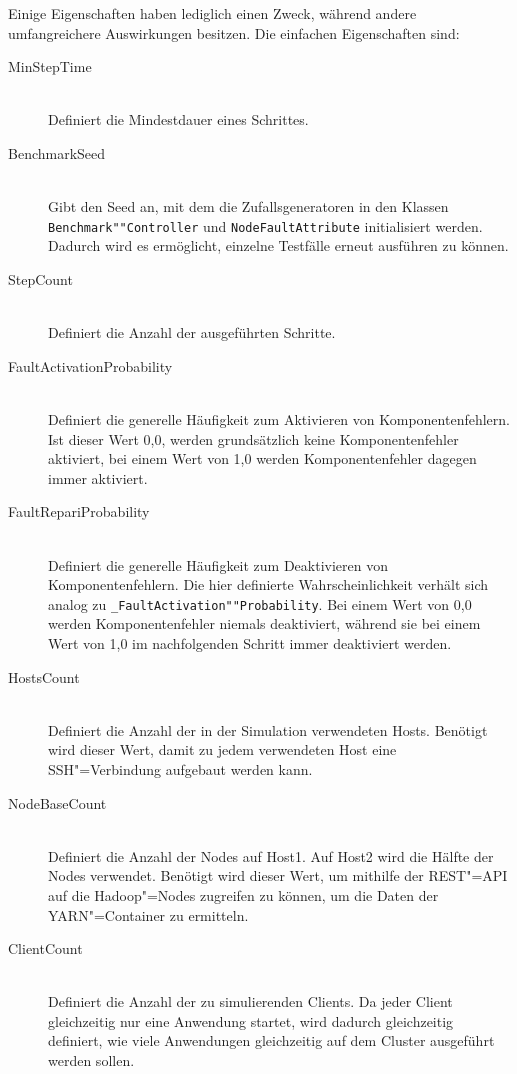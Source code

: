 Einige Eigenschaften haben lediglich einen Zweck, während andere umfangreichere Auswirkungen besitzen.
Die einfachen Eigenschaften sind:

\begin{description}
    \item [MinStepTime] \hfill \\
        Definiert die Mindestdauer eines Schrittes.
        
    \item[BenchmarkSeed] \hfill \\
        Gibt den Seed an, mit dem die Zufallsgeneratoren in den Klassen \texttt{Benchmark""Controller} und \texttt{NodeFaultAttribute} initialisiert werden.
        Dadurch wird es ermöglicht, einzelne Testfälle erneut ausführen zu können.
        
    \item[StepCount] \hfill \\
        Definiert die Anzahl der ausgeführten Schritte.
        
    \item[FaultActivationProbability] \hfill \\
        Definiert die generelle Häufigkeit zum Aktivieren von Komponentenfehlern.
        Ist dieser Wert 0,0, werden grundsätzlich keine Komponentenfehler aktiviert, bei einem Wert von 1,0 werden Komponentenfehler dagegen immer aktiviert.
        
    \item[FaultRepariProbability] \hfill \\
        Definiert die generelle Häufigkeit zum Deaktivieren von Komponentenfehlern.
        Die hier definierte Wahrscheinlichkeit verhält sich analog zu \texttt{\_FaultActivation""Probability}.
        Bei einem Wert von 0,0 werden Komponentenfehler niemals deaktiviert, während sie bei einem Wert von 1,0 im nachfolgenden Schritt immer deaktiviert werden.
        
    \item[HostsCount] \hfill \\
        Definiert die Anzahl der in der Simulation verwendeten Hosts.
        Benötigt wird dieser Wert, damit zu jedem verwendeten Host eine SSH"=Verbindung aufgebaut werden kann.
        
    \item[NodeBaseCount] \hfill \\
        Definiert die Anzahl der Nodes auf Host1.
        Auf Host2 wird die Hälfte der Nodes verwendet.
        Benötigt wird dieser Wert, um mithilfe der REST"=API auf die Hadoop"=Nodes zugreifen zu können, um die Daten der YARN"=Container zu ermitteln.
        
    \item[ClientCount] \hfill \\
        Definiert die Anzahl der zu simulierenden Clients.
        Da jeder Client gleichzeitig nur eine Anwendung startet, wird dadurch gleichzeitig definiert, wie viele Anwendungen gleichzeitig auf dem Cluster ausgeführt werden sollen.
\end{description}


